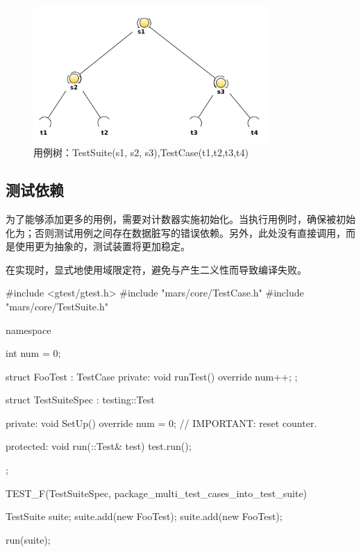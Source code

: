 \begin{content}
\begin{figure}[H]
\centering
\includegraphics[width=0.8\textwidth]{figures/xunit/test-tree-example.png}
\caption{用例树：TestSuite(s1, s2, s3),TestCase(t1,t2,t3,t4)}
 \label{fig:test-case-tree}
\end{figure}

\subsection{测试依赖}

为了能够添加更多的用例，需要对计数器实施初始化。当执行用例时，确保被初始化为；否则测试用例之间存在数据脏写的错误依赖。另外，此处没有直接调用，而是使用更为抽象的，测试装置将更加稳定。

在实现时，显式地使用域限定符，避免与产生二义性而导致编译失败。

\begin{leftbar}
 \begin{c++}[caption={\ttfamily{test/mars/core/TestSuiteSpec.cc}}]
#include <gtest/gtest.h>
#include "mars/core/TestCase.h"
#include "mars/core/TestSuite.h"

namespace {
  int num = 0;

  struct FooTest : TestCase {
  private:
    void runTest() override {
      num++;
    }
  };

  struct TestSuiteSpec : testing::Test {
  private:
    void SetUp() override {
      num = 0;  // IMPORTANT: reset counter.
    }

  protected:
    void run(::Test& test) {
      test.run();
    }
  };
}

TEST_F(TestSuiteSpec, package_multi_test_cases_into_test_suite) {
  TestSuite suite;
  suite.add(new FooTest);
  suite.add(new FooTest);

  run(suite);

}
\end{c++}
\end{leftbar}
\end{content}
